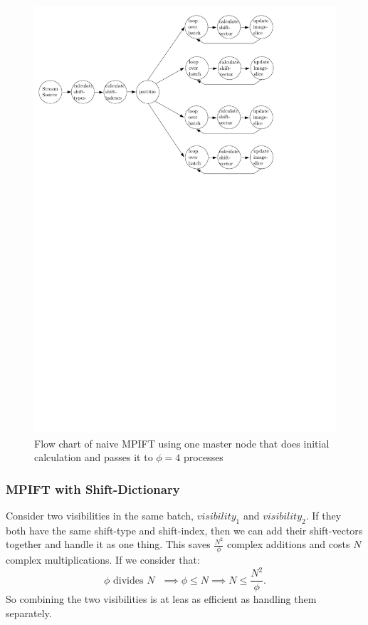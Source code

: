 \documentclass[12pt]{article}
\begin{document}
\begin{figure}[H]
	\begin{center}
	\includegraphics[width=400pt]{NAIVE_SPIFT_plan}
\end{center}
\caption{Flow chart of naive MPIFT using one master node that does initial calculation and passes it to $\phi=4$ processes}
\label{fig::naive_spift_plan}
\end{figure}

\subsubsection{MPIFT with Shift-Dictionary}
\label{sec::SPIFT_with_Dic}
Consider two visibilities in the same batch, $visibility_1$ and $visibility_2$. If they both have the same shift-type and shift-index, then we can add their shift-vectors together and handle it as one thing. This saves $\frac{N^2}{\phi}$ complex additions and costs $N$complex multiplications. If we consider that:
\[ \textrm{$\phi$ divides $N$ }
 \implies \phi\leq N \implies N\leq\frac{N^2}{\phi}.
 \]
  So combining the two visibilities is at leas as efficient as handling them separately.
\end{document}
